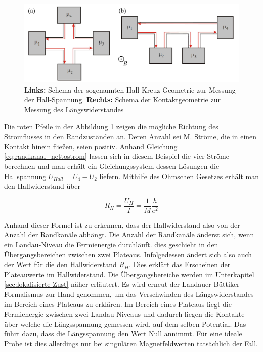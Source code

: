 \begin{figure}[h]
\centering
\includegraphics[width=0.7\linewidth]{images/Anleitungsheft/Vierpunktmessung_Anleitungsheft}
\caption[Vierpunkt-Messung]{\textbf{Links:} Schema der sogenannten Hall-Kreuz-Geometrie zur Messung der Hall-Spannung. \textbf{Rechts:} Schema der Kontaktgeometrie zur Messung des Längswiderstandes}
\label{fig:Vierpunktmessung_Anleitungsheft}
\end{figure}

Die roten Pfeile in der Abbildung \ref{fig:Vierpunktmessung_Anleitungsheft} zeigen die mögliche Richtung des Stromflusses in den Randzuständen an. Deren Anzahl sei M. Ströme, die in einen Kontakt hinein fließen, seien positiv. 
Anhand Gleichung \ref{eq:randkanal_nettostrom} lassen sich in diesem Beispiel die vier Ströme berechnen und man erhält ein Gleichungssystem dessen Lösungen die Hallspannung $U_{Hall}=U_4-U_2$ liefern. 
Mithilfe des Ohmschen Gesetzes erhält man den Hallwiderstand über

\begin{equation}
R_H=\frac{U_H}{I}=\frac{1}{M}\frac{h}{e^2}
\label{eq:U_Hall_simpel}
\end{equation}

Anhand dieser Formel ist zu erkennen, dass der Hallwiderstand also von der Anzahl der Randkanäle abhängt. Die Anzahl der Randkanäle änderst sich, wenn ein Landau-Niveau die Fermienergie durchläuft. dies geschieht in den Übergangsbereichen zwischen zwei Plateaus. Infolgedessen ändert sich also auch der Wert für die den Hallwiderstand $R_H$. Dies erklärt das Erscheinen der Plateauwerte im Hallwiderstand. Die Übergangsbereiche werden im Unterkapitel \ref{sec:lokalisierte Zust} näher erläutert. 
Es wird erneut der Landauer-Büttiker-Formalismus zur Hand genommen, um das Verschwinden des Längswiderstandes im Bereich eines Plateaus zu erklären. Im Bereich eines Plateaus liegt die Fermienergie zwischen zwei Landau-Niveaus und dadurch liegen die Kontakte über welche die Längsspannung gemessen wird, auf dem selben Potential. Das führt dazu, dass die Längsspannung den Wert Null annimmt. Für eine ideale Probe ist dies allerdings nur bei singulären Magnetfeldwerten tatsächlich der Fall.


